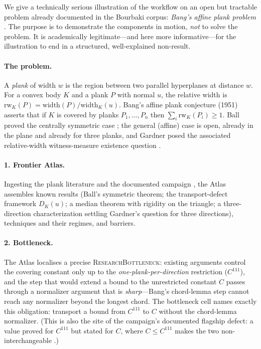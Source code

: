 \documentclass[11pt]{article}
\theoremstyle{definition}
\theoremstyle{remark}
\newcommand{\ntype}[1]{\textsc{#1}}
\begin{document}
We give a technically serious illustration of the workflow on an open but tractable problem already
documented in the Bourbaki corpus: \emph{Bang's affine plank problem}
\citep{bang1951,ball1991,gardner1988,lucius2026bang}. The purpose is to demonstrate the components in
motion, \emph{not} to solve the problem. It is academically legitimate---and here more
informative---for the illustration to end in a structured, well-explained non-result.

\paragraph{The problem.} A \emph{plank} of width $w$ is the region between two parallel hyperplanes
at distance $w$. For a convex body $K$ and a plank $P$ with normal $u$, the relative width is
$\mathrm{rw}_K(P) = \mathrm{width}(P)/\mathrm{width}_K(u)$. Bang's affine plank conjecture (1951)
asserts that if $K$ is covered by planks $P_1,\dots,P_n$ then $\sum_i \mathrm{rw}_K(P_i) \ge 1$.
Ball proved the centrally symmetric case \citep{ball1991}; the general (affine) case is open, already
in the plane and already for three planks, and Gardner posed the associated relative-width
witness-measure existence question \citep{gardner1988}.

\paragraph{1. Frontier Atlas.} Ingesting the plank literature and the documented campaign
\citep{lucius2026bang}, the Atlas assembles known results (Ball's symmetric theorem; the
transport-defect framework $D_K(u)$; a median theorem with rigidity on the triangle; a
three-direction characterization settling Gardner's question for three directions), techniques and
their regimes, and barriers.

\paragraph{2. Bottleneck.} The Atlas localises a precise \ntype{ResearchBottleneck}: existing
arguments control the covering constant only up to the \emph{one-plank-per-direction} restriction
($C^{111}$), and the step that would extend a bound to the unrestricted constant $C$ passes through a
normalizer argument that is \emph{sharp}---Bang's chord-lemma step cannot reach any normalizer beyond
the longest chord. The bottleneck cell names exactly this obligation: transport a bound from
$C^{111}$ to $C$ without the chord-lemma normalizer. (This is also the site of the campaign's
documented flagship defect: a value proved for $C^{111}$ but stated for $C$, where $C \le C^{111}$
makes the two non-interchangeable \citep{lucius2026mirador}.)
\end{document}
